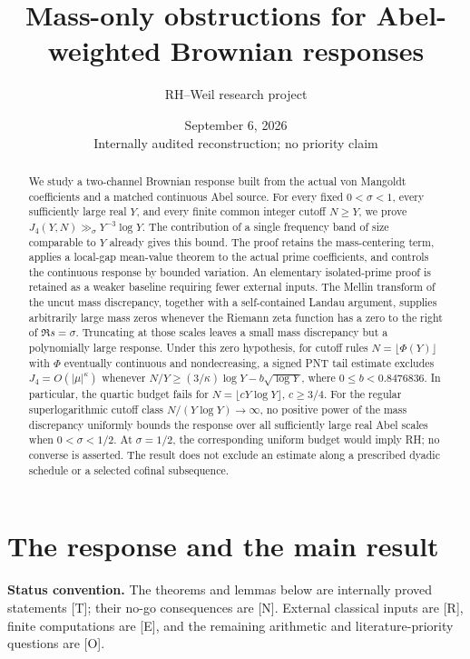 \documentclass[11pt,a4paper]{article}
\title{Mass-only obstructions for Abel-weighted Brownian responses}
\author{RH--Weil research project}
\date{September 6, 2026\\[3pt]\small Internally audited reconstruction; no priority claim}
\theoremstyle{definition}
\theoremstyle{remark}
\begin{document}
\maketitle
\begin{abstract}
We study a two-channel Brownian response built from the actual
von Mangoldt coefficients and a matched continuous Abel source.
For every fixed \(0<\sigma<1\), every sufficiently large real \(Y\),
and every finite common integer cutoff \(N\ge Y\), we prove
\(J_4(Y,N)\gg_\sigma Y^{-3}\log Y\).
The contribution of a single frequency band of size comparable to
\(Y\) already gives this bound. The proof retains the mass-centering
term, applies a local-gap mean-value theorem to the actual prime
coefficients, and controls the continuous response by bounded variation.
An elementary isolated-prime proof is retained as a weaker baseline
requiring fewer external inputs.
The Mellin transform of the uncut mass discrepancy, together with
a self-contained Landau argument, supplies arbitrarily large mass
zeros whenever the Riemann zeta function has a zero to the right
of \(\Re s=\sigma\). Truncating at those scales leaves a
small mass discrepancy but a polynomially large response.
Under this zero hypothesis, for cutoff rules \(N=\lfloor\Phi(Y)\rfloor\)
with \(\Phi\) eventually continuous and nondecreasing, a signed PNT tail
estimate excludes \(J_4=O(|\mu|^\kappa)\) whenever
\(N/Y\ge(3/\kappa)\log Y-b\sqrt{\log Y}\), where
\(0\le b<0.8476836\). In particular, the quartic budget fails for
\(N=\lfloor cY\log Y\rfloor\), \(c\ge3/4\).
For the regular superlogarithmic cutoff class
\(N/(Y\log Y)\to\infty\), no positive power of the mass discrepancy
uniformly bounds the response over all sufficiently large real
Abel scales when \(0<\sigma<1/2\). At \(\sigma=1/2\), the corresponding
uniform budget would imply RH; no converse is asserted.
The result does not exclude an estimate along a prescribed dyadic
schedule or a selected cofinal subsequence.
\end{abstract}

\section{The response and the main result}

\noindent\textbf{Status convention.}
The theorems and lemmas below are internally proved statements [T];
their no-go consequences are [N]. External classical inputs are [R],
finite computations are [E], and the remaining arithmetic and
literature-priority questions are [O].
\end{document}
